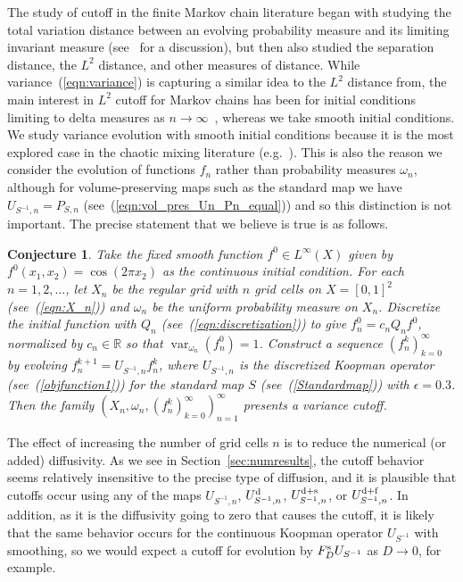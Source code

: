 \documentclass{aims}
\newtheorem{conjecture}{Conjecture}
\theoremstyle{definition}
\begin{document}
The study of cutoff in the finite Markov chain literature began with
studying the total variation distance between an evolving probability
measure and its limiting invariant measure (see~\cite{Diaconis1996,
  Diaconis2005} for a discussion), but then also studied the
separation distance, the $L^2$ distance, and other measures of
distance. While variance~(\ref{eqn:variance}) is capturing a similar
idea to the $L^2$ distance from\cite{Diaconis2005}, the main interest
in $L^2$ cutoff for Markov chains has been for initial conditions
limiting to delta measures as $n \to \infty$~\cite{Chen2006}, whereas
we take smooth initial conditions. We study variance evolution with
smooth initial conditions because it is the most explored case in the
chaotic mixing literature (e.g.~\cite{Mezic2005,Thiffeault2003-13}).
This is also the reason we consider the evolution of functions $f_n$
rather than probability measures $\omega_n$, although for
volume-preserving maps such as the standard map we have $U_{S^{-1},n}
= P_{S,n}$ (see~(\ref{eqn:vol_pres_Un_Pn_equal})) and so this
distinction is not important. The precise statement that we believe is
true is as follows.

\begin{conjecture}
  \label{con:cutoff}
  Take the fixed smooth function $f^0 \in L^\infty(X)$ given by
  $f^0(x_1,x_2) = \cos(2\pi x_2)$ as the continuous initial
  condition. For each $n = 1,2,\ldots$, let $X_n$ be the regular grid
  with $n$ grid cells on $X = [0,1]^2$ (see~(\ref{eqn:X_n})) and
  $\omega_n$ be the uniform probability measure on $X_n$. Discretize
  the initial function with $Q_n$ (see~(\ref{eqn:discretization})) to
  give $f_n^0 = c_n Q_n f^0$, normalized by $c_n \in \mathbb{R}$ so
  that $\operatorname{var}_{\omega_n}(f_n^0) = 1$. Construct a
  sequence $(f_n^k)_{k=0}^\infty$ by evolving $f_n^{k+1} =
  U_{S^{-1},n} f_n^k$, where $U_{S^{-1},n}$ is the discretized Koopman
  operator (see~(\ref{objfunction1})) for the standard map $S$
  (see~(\ref{Standardmap})) with $\epsilon = 0.3$. Then the family
  $(X_n, \omega_n, (f^k_n)_{k=0}^{\infty})_{n=1}^{\infty}$ presents a
  variance cutoff.
\end{conjecture}

The effect of increasing the number of grid cells $n$ is to reduce the
numerical (or added) diffusivity. As we see in
Section~\ref{sec:numresults}, the cutoff behavior seems relatively
insensitive to the precise type of diffusion, and it is plausible that
cutoffs occur using any of the maps $U_{S^{-1},n}$, $U_{S^{-1},n}^{\rm
  d}$, $U_{S^{-1},n}^{\rm d+s}$, or $U_{S^{-1},n}^{\rm d+f}$. In
addition, as it is the diffusivity going to zero that causes the cutoff,
it is likely that the same behavior occurs for the continuous Koopman
operator $U_{S^{-1}}$ with smoothing, so we would expect a cutoff for
evolution by $F^{\rm s}_D U_{S^{-1}}$ as $D \to 0$, for example.
\end{document}
